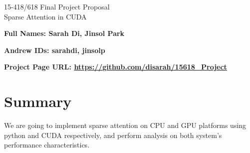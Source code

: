 \documentclass[11pt]{article}
\begin{document}
\begin{center}
\LARGE
15-418/618 \thisterm{} Final Project Proposal
\\ 
Sparse Attention in CUDA
\end{center}
\begin{flushright}
{\large\bf Full Names: Sarah Di, Jinsol Park\makebox[2in][l]{

}}

{\large\bf Andrew IDs: sarahdi, jinsolp\makebox[2in][l]{\tt

}}
\end{flushright}

{\large\bf Project Page URL: \url{https://github.com/disarah/15618\_Project}\makebox[2in][l]{

}}



\section{Summary}
We are going to implement sparse attention on CPU and GPU platforms using python and CUDA respectively, and perform analysis on both system's performance characteristics.





\end{document}
